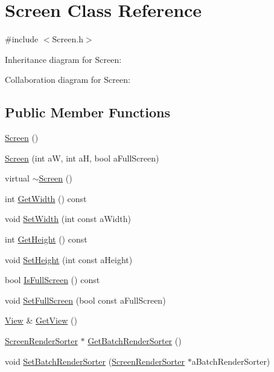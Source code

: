 \hypertarget{classScreen}{}\section{Screen Class Reference}
\label{classScreen}


{\ttfamily \#include $<$Screen.\+h$>$}



Inheritance diagram for Screen\+:


Collaboration diagram for Screen\+:
\subsection*{Public Member Functions}
\begin{DoxyCompactItemize}
\item 
\hyperlink{classScreen_ae7576476fc6e6a6eaa66389fdc41fe72}{Screen} ()
\item 
\hyperlink{classScreen_ae83c264422248fb301d7571c319298f6}{Screen} (int aW, int aH, bool a\+Full\+Screen)
\item 
virtual \hyperlink{classScreen_a4243bc17596af96415b09ac48205676d}{$\sim$\+Screen} ()
\item 
int \hyperlink{classScreen_a125072d815aefe2debfd5d6e7da1baf8}{Get\+Width} () const 
\item 
void \hyperlink{classScreen_a72810fa8cd0db6bc2ddde6a172790f41}{Set\+Width} (int const a\+Width)
\item 
int \hyperlink{classScreen_a0bacb2d30942fb7acfd4bcb52ccdb2f9}{Get\+Height} () const 
\item 
void \hyperlink{classScreen_a08c25c229d22dab7954812012c0d6249}{Set\+Height} (int const a\+Height)
\item 
bool \hyperlink{classScreen_af73f43cca23323b9d96804d547cad3a4}{Is\+Full\+Screen} () const 
\item 
void \hyperlink{classScreen_a920cd9ef8dbc743a13502b94f93c6c25}{Set\+Full\+Screen} (bool const a\+Full\+Screen)
\item 
\hyperlink{classView}{View} \& \hyperlink{classScreen_a1e3891893800bf04a602c2489c2f11b9}{Get\+View} ()
\item 
\hyperlink{classScreenRenderSorter}{Screen\+Render\+Sorter} $\ast$ \hyperlink{classScreen_a8185957db56fd6dd23938afd3c5c24a8}{Get\+Batch\+Render\+Sorter} ()
\item 
void \hyperlink{classScreen_af91def02d2d29633583deaffefc9f286}{Set\+Batch\+Render\+Sorter} (\hyperlink{classScreenRenderSorter}{Screen\+Render\+Sorter} $\ast$a\+Batch\+Render\+Sorter)

\end{DoxyCompactItemize}

